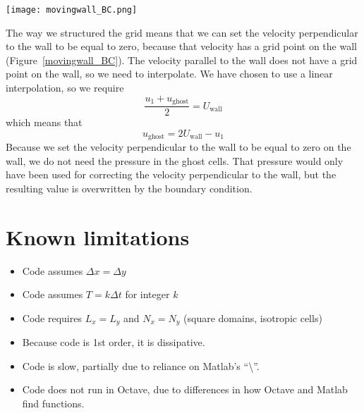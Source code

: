 \documentclass[12pt]{article}
\begin{document}
\begin{center}
\begin{figure*}
\center
\texttt{[image: movingwall\_BC.png]} 
\caption{Schematic of moving wall boundary condition interpolation.}
\label{movingwall_BC}
\end{figure*}
\end{center}

The way we structured the grid means that we can set the velocity perpendicular to the wall to be equal to zero, because that velocity has a grid point on the wall (Figure~\ref{movingwall_BC}).  The velocity parallel to the wall does not have a grid point on the wall, so we need to interpolate. We have chosen to use a linear interpolation, so we require
\[ \frac{u_1 + u_{\mathrm{ghost}}}{2} = U_{\mathrm{wall}}\]
which means that
\begin{equation}
u_{\mathrm{ghost}} = 2U_{\mathrm{wall}} - u_1
\end{equation}
Because we set the velocity perpendicular to the wall to be equal to zero on the wall, we do not need the pressure in the ghost cells.  That pressure would only have been used for correcting the velocity perpendicular to the wall, but the resulting value is overwritten by the boundary condition.

\section{Known limitations}
\begin{itemize}
\item Code assumes $\Delta x=\Delta y$
\item Code assumes $T = k\Delta t$ for integer $k$
\item Code requires $L_x = L_y$ and $N_x = N_y$ (square domains, isotropic cells)
\item Because code is 1st order, it is dissipative.
\item Code is slow, partially due to reliance on Matlab's ``\textbackslash''.
\item Code does not run in Octave, due to differences in how Octave and Matlab find functions.
\end{itemize}
\end{document}
